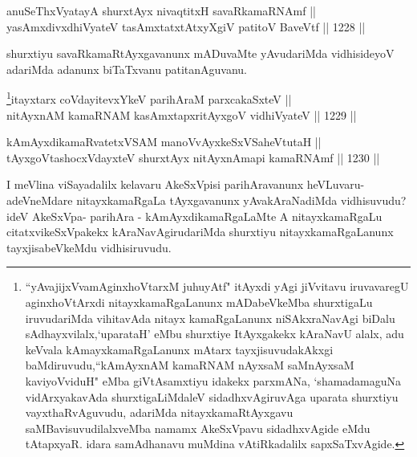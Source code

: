 
\begin{shl}
anuSeThxVyatayA shurxtAyx nivaqtitxH savaRkamaRNAmf || \\
yasAmxdivxdhiVyateV tasAmxtatxtAtxyXgiV patitoV BaveVtf \hfill || 1228 ||  
\end{shl}

\begin{artha}
shurxtiyu savaRkamaRtAyxgavanunx mADuvaMte yAvudariMda vidhisideyoV adariMda adanunx biTaTxvanu patitanAguvanu.
\end{artha}




\begin{shl}
\footnote{``yAvajijxVvamAginxhoVtarxM juhuyAtf" itAyxdi yAgi jiVvitavu iruvavaregU aginxhoVtArxdi nitayxkamaRgaLanunx mADabeVkeMba shurxtigaLu iruvudariMda vihitavAda nitayx kamaRgaLanunx niSAkxraNavAgi biDalu sAdhayxvilalx,`uparataH' eMbu shurxtiye ItAyxgakekx kAraNavU alalx, adu keVvala kAmayxkamaRgaLanunx mAtarx tayxjisuvudakAkxgi baMdiruvudu,``kAmAyxnAM kamaRNAM nAyxsaM saMnAyxsaM kaviyoVviduH" eMba giVtAsamxtiyu idakekx parxmANa, `shamadamaguNa vidArxyakavAda shurxtigaLiMdaleV sidadhxvAgiruvAga uparata shurxtiyu vayxthaRvAguvudu, adariMda nitayxkamaRtAyxgavu saMBavisuvudilalxveMba namamx AkeSxVpavu sidadhxvAgide eMdu tAtapxyaR. idara samAdhanavu muMdina vAtiRkadalilx sapxSaTxvAgide.}itayxtarx coVdayitevxYkeV parihAraM parxcakaSxteV || \\
nitAyxnAM kamaRNAM kasAmxtapxritAyxgoV vidhiVyateV \hfill || 1229 ||  
\end{shl}
				
\begin{shl}
kAmAyxdikamaRvatetxVSAM manoVvAyxkeSxVSaheVtutaH || \\
tAyxgoV\s tashocxVdayxteV shurxtAyx nitAyxnAmapi kamaRNAmf \hfill || 1230 ||  
\end{shl}

\begin{artha}
I meVlina viSayadalilx kelavaru AkeSxVpisi parihAravanunx heVLuvaru-adeVneMdare nitayxkamaRgaLa tAyxgavanunx yAvakAraNadiMda vidhisuvudu?ideV AkeSxVpa- parihAra - kAmAyxdikamaRgaLaMte A nitayxkamaRgaLu citatxvikeSxVpakekx kAraNavAgirudariMda shurxtiyu nitayxkamaRgaLanunx tayxjisabeVkeMdu vidhisiruvudu.
\end{artha}

